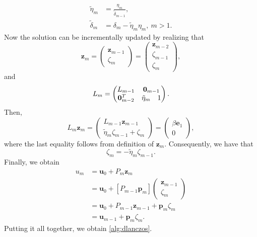 \begin{align*}
  \tilde{\eta}_m   & = \frac{\eta_m}{\tilde{\delta}_{m-1}},       \\
  \tilde{\delta}_m & = \delta_m - \tilde{\eta}_m \eta_m, \ m > 1.
\end{align*}
Now the solution can be incrementally updated by realizing that
\[
  \mathbf{z}_m =
  \begin{pmatrix}
    \mathbf{z}_{m-1} \\
    \zeta_m
  \end{pmatrix} =
  \begin{pmatrix}
    \mathbf{z}_{m-2}     \\
    \zeta_{m-1} \\
    \zeta_m
  \end{pmatrix},
\]
and
\[
  L_m =
  \begin{pmatrix}
    L_{m-1}            & \multicolumn{2}{c}{\mathbf{0}_{m-1}}     \\
    \mathbf{0}_{m-2}^T & \tilde{\eta}_m                       & 1
  \end{pmatrix}.
\]
Then,
\[
  L_m \mathbf{z}_m =
  \begin{pmatrix}
    L_{m-1} \mathbf{z}_{m-1} \\
    \tilde{\eta}_m \zeta_{m-1} + \zeta_m
  \end{pmatrix} =
  \begin{pmatrix}
    \beta \mathbf{e}_1 \\
    0
  \end{pmatrix},
\]
where the last equality follows from definition of $\mathbf{z}_m$. Consequently, we have that
\[
  \zeta_m = -\tilde{\eta}_m \zeta_{m-1}.
\]
Finally, we obtain
\begin{align*}
  u_m & = \mathbf{u}_0 + P_m \mathbf{z}_m                                   \\
      & = \mathbf{u}_0 + \left[P_{m-1} \mathbf{p}_m\right] 
      \begin{pmatrix}
                                             \mathbf{z}_{m-1} \\
                                            \zeta_m
                                           \end{pmatrix} \\
      & = \mathbf{u}_0 + P_{m-1} \mathbf{z}_{m-1} + \mathbf{p}_m \zeta_m \\
      & = \mathbf{u}_{m-1} + \mathbf{p}_m \zeta_m.
\end{align*}
Putting it all together, we obtain \cref{alg:dlanczos}.
